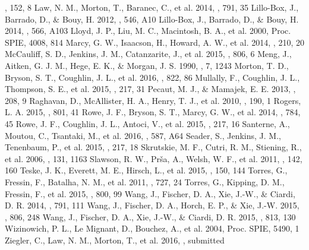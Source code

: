 \documentclass[twocolumn,appendixfloats]{aastex6}
\begin{document}
\begin{thebibliography}{}
\aj, 152, 8
 Law, N. M., Morton, T., Baranec, C., et al.  2014,
\apj, 791, 35
 Lillo-Box, J., Barrado, D., \& Bouy, H.
2012, \aap, 546, A10
 Lillo-Box, J., Barrado, D., \& Bouy, H.
2014, \aap, 566, A103
 Lloyd, J. P., Liu, M. C., Macintosh, B. A., et al.
2000, Proc. SPIE, 4008, 814
 Marcy, G. W., Isaacson, H., Howard, A. W.,
et al.  2014, \apjs, 210, 20
 McCauliff, S. D., Jenkins, J. M., 
Catanzarite, J., et al.  2015, \apj, 806, 6
 Meng, J., Aitken, G. J. M., Hege, E. K., \& 
Morgan, J. S.  1990, \josaa, 7, 1243
 Morton, T. D., Bryson, S. T., Coughlin, J. L.,
et al.  2016, \apj, 822, 86
 Mullally, F., Coughlin, J. L., Thompson, S. E.,
et al.  2015, \apjs, 217, 31
 Pecaut, M. J., \& Mamajek, E. E.  2013,
\apjs, 208, 9
 Raghavan, D., McAllister, H. A., Henry, T. J.,
et al.  2010, \apjs, 190, 1
 Rogers, L. A.  2015, \apj, 801, 41
 Rowe, J. F., Bryson, S. T., Marcy, G. W.,
et al.  2014, \apj, 784, 45
 Rowe, J. F., Coughlin, J. L., Antoci, V., et al.
2015, \apjs, 217, 16
 Santerne, A., Moutou, C., Tsantaki, M.,
et al.  2016, \aap, 587, A64
 Seader, S., Jenkins, J. M., Tenenbaum, P.,
et al.  2015, \apjs, 217, 18
 Skrutskie, M. F., Cutri, R. M.,
Stiening, R., et al.  2006, \aj, 131, 1163
 Slawson, R. W., Pr\v{s}a, A., Welsh, W. F.,
et al.  2011, \aj, 142, 160
 Teske, J. K., Everett, M. E., Hirsch, L., et al.
2015, \aj, 150, 144
 Torres, G., Fressin, F., Batalha, N. M., et al.
2011, \apj, 727, 24
 Torres, G., Kipping, D. M., Fressin, F., et al.
2015, \apj, 800, 99
 Wang, J., Fischer, D. A., Xie, J.-W., \& Ciardi,
D. R.  2014, \apj, 791, 111
 Wang, J., Fischer, D. A., Horch, E. P., \&
Xie, J.-W.  2015, \apj, 806, 248
 Wang, J., Fischer, D. A., Xie, J.-W., \& Ciardi,
D. R.  2015, \apj, 813, 130
 Wizinowich, P. L., Le Mignant, D.,
Bouchez, A., et al.  2004, Proc. SPIE, 5490, 1
 Ziegler, C., Law, N. M., Morton, T., et al.
2016, \apj, submitted
\end{thebibliography}
\end{document}
